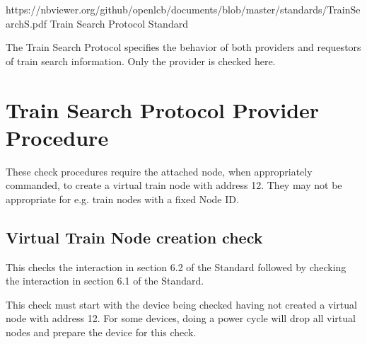



\maketitle
\thispagestyle{firststyle}

\introductionCaveats
    {https://nbviewer.org/github/openlcb/documents/blob/master/standards/TrainSearchS.pdf}
    {Train Search Protocol Standard}

The Train Search Protocol specifies the behavior of both providers and requestors of 
train search information.  Only the provider is checked here.


\section{Train Search Protocol Provider Procedure}


These check procedures require the attached node, when appropriately commanded,
to create a virtual train node with address 12. They may not be appropriate
for e.g. train nodes with a fixed Node ID.

\subsection{Virtual Train Node creation check}

This checks the interaction in section 6.2 of the Standard
followed by checking the interaction in section 6.1 of the Standard.

This check must start with the device being checked having not created a
virtual node with address 12. For some devices, doing a power cycle will 
drop all virtual nodes and prepare the device for this check.

